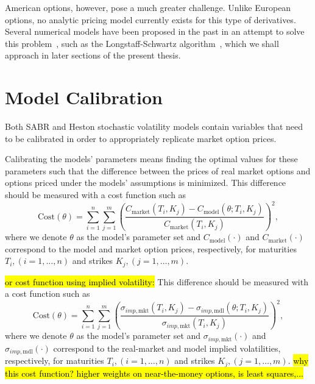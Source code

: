  American options, however, pose a much greater challenge.  Unlike European options, no analytic pricing model currently exists for this type of derivatives. Several numerical models have been proposed in the past in an attempt to solve this problem~\cite{Wilmott1,Hull}, such as the Longstaff-Schwartz algorithm~\citep{Longstaff}, which we shall approach in later sections of the present thesis.
\fi 

 
 
 
\section{Model Calibration}
\label{section:Model Calibration}
Both SABR and Heston stochastic volatility models contain variables that need to be calibrated in order to appropriately replicate market option prices.


Calibrating the models' parameters means finding the optimal values for these parameters such that the difference between the prices of real market options and options priced under the models' assumptions is minimized. This difference should be measured with a cost function such as
\begin{equation}\label{cost}
\mathrm{Cost}(\theta)=\sum_{i=1}^n\sum_{j=1}^m\left(\frac{C_{\mathrm{market}}(T_i,K_j)-C_{\mathrm{model}}(\theta;T_i,K_j)}{C_{\mathrm{market}}(T_i,K_j)}\right)^2,
\end{equation}
\noindent where we denote $\theta$ as the model's parameter set and $C_{\mathrm{model}}(\cdot)$ and $C_{\mathrm{market}}(\cdot)$ correspond to the model and market option prices, respectively, for maturities $T_i,(i=1,\ldots,n)$ and strikes $K_j,(j=1,\ldots,m)$.

\hl{or cost function using implied volatility:}
This difference should be measured with a cost function such as
\begin{equation}\label{cost}
\mathrm{Cost}(\theta)=\sum_{i=1}^n\sum_{j=1}^m\left(\frac{\sigma_{imp,\mathrm{mkt}}(T_i,K_j)-\sigma_{imp,\mathrm{mdl}}(\theta;T_i,K_j)}{\sigma_{imp,\mathrm{mkt}}(T_i,K_j)}\right)^2,
\end{equation}
\noindent where we denote $\theta$ as the model's parameter set and $\sigma_{imp,\mathrm{mkt}}(\cdot)$ and $\sigma_{imp,\mathrm{mdl}}(\cdot)$ correspond to the real-market and model implied volatilities, respectively, for maturities $T_i,(i=1,\ldots,n)$ and strikes $K_j,(j=1,\ldots,m)$.
\hl{why this cost function? higher weights on near-the-money options, is least squares,...}

